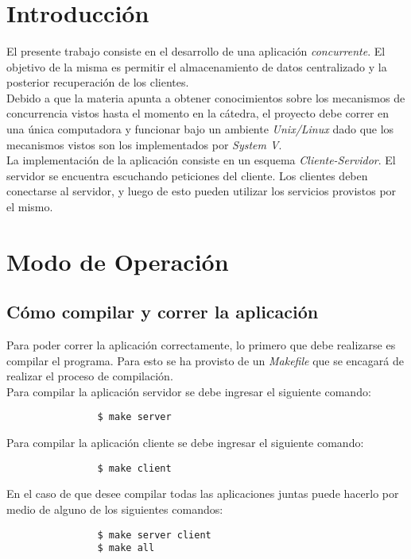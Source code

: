 \documentclass[a4paper,10pt]{article}
\title{  }
\begin{document}
	\maketitle %
	\newpage

	\tableofcontents %
	\newpage

	\section{Introducci\'on}
		El presente trabajo consiste en el desarrollo de una aplicaci\'on {\it concurrente}. El objetivo de la misma
		es permitir el almacenamiento de datos centralizado y la posterior recuperaci\'on de los clientes. \\
		\indent Debido a que la materia apunta a obtener conocimientos sobre los mecanismos de concurrencia vistos hasta el momento en la c\'atedra, 
    el proyecto debe correr en una \'unica computadora y funcionar bajo un ambiente \emph{Unix/Linux} dado que los mecanismos vistos son los 
    implementados por \emph{System V}. \\
		\indent La implementaci\'on de la aplicaci\'on consiste en un esquema \emph{Cliente-Servidor}. El servidor se encuentra escuchando peticiones
		del cliente. Los clientes deben conectarse al servidor, y luego de esto pueden utilizar los servicios provistos por el mismo.
		\vspace{0.5cm}

	\section{Modo de Operaci\'on}

		\subsection {C\'omo compilar y correr la aplicaci\'on}
			Para poder correr la aplicaci\'on correctamente, lo primero que debe realizarse es compilar el programa. Para esto se ha provisto de un
			\emph{Makefile} que se encagar\'a de realizar el proceso de compilaci\'on. \\
			\indent Para compilar la aplicaci\'on servidor se debe ingresar el siguiente comando:
			\begin{verbatim}
				$ make server
			\end{verbatim}
			\indent Para compilar la aplicaci\'on cliente se debe ingresar el siguiente comando:
			\begin{verbatim}
				$ make client
			\end{verbatim}
			\indent En el caso de que desee compilar todas las aplicaciones juntas puede hacerlo por medio de alguno de los siguientes comandos:
			\begin{verbatim}
				$ make server client 
				$ make all
			\end{verbatim}
\end{document}
